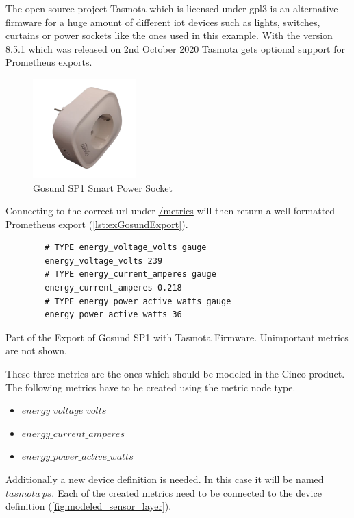 The open source project Tasmota \cite{tasmotawebsite} which is licensed under \gls{gpl3} is an alternative firmware for a huge amount of different \gls{iot} devices such as lights, switches, curtains or power sockets like the ones used in this example.
With the version 8.5.1 which was released on 2nd October 2020 Tasmota gets optional support for Prometheus exports. 

\begin{figure}[!ht]
	\centering
	\includegraphics[width=4cm]{assets/images/gosund.png}
	\caption{Gosund SP1 Smart Power Socket}
	\label{fig:gosund_sp1}
\end{figure}

Connecting to the correct \gls{url} under \url{/metrics} will then return a well formatted Prometheus export (\cref{lst:exGosundExport}).

\begin{listing}[!ht]
	\begin{verbatim}
		# TYPE energy_voltage_volts gauge
		energy_voltage_volts 239
		# TYPE energy_current_amperes gauge
		energy_current_amperes 0.218
		# TYPE energy_power_active_watts gauge
		energy_power_active_watts 36
	\end{verbatim}
	\caption{Part of the Export of Gosund SP1 with Tasmota Firmware. Unimportant metrics are not shown.}
	\label{lst:exGosundExport}
\end{listing}

These three metrics are the ones which should be modeled in the Cinco product. The following metrics have to be created using the metric node type. 

\begin{itemize}
	\item $energy\_voltage\_volts$
	\item $energy\_current\_amperes$
	\item $energy\_power\_active\_watts$ 
\end{itemize}

Additionally a new device definition is needed. In this case it will be named $tasmota\ ps$. Each of the created metrics need to be connected to the device definition (\cref{fig:modeled_sensor_layer}).

